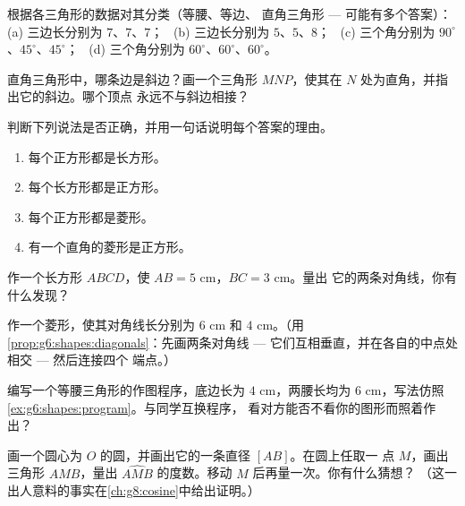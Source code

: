 \begin{exercise}[$\star$]\label{exo:g6:shapes:4}
根据各三角形的数据对其分类（等腰、等边、
直角三角形 --- 可能有多个答案）：
(a) 三边长分别为 $7$、$7$、$7$； \
(b) 三边长分别为 $5$、$5$、$8$； \
(c) 三个角分别为 $90^\circ$、$45^\circ$、$45^\circ$； \
(d) 三个角分别为 $60^\circ$、$60^\circ$、$60^\circ$。
\end{exercise}

\begin{exercise}[$\star$]\label{exo:g6:shapes:5}
直角三角形中，哪条边是斜边？画一个三角形
$MNP$，使其在 $N$ 处为直角，并指出它的斜边。哪个顶点
永远不与斜边相接？
\end{exercise}

\begin{exercise}[$\star$]\label{exo:g6:shapes:6}
判断下列说法是否正确，并用一句话说明每个答案的理由。
\begin{enumerate}
  \item 每个正方形都是长方形。
  \item 每个长方形都是正方形。
  \item 每个正方形都是菱形。
  \item 有一个直角的菱形是正方形。
\end{enumerate}
\end{exercise}

\begin{exercise}[$\star$]\label{exo:g6:shapes:7}
作一个长方形 $ABCD$，使 $AB = 5$ cm，$BC = 3$ cm。量出
它的两条对角线，你有什么发现？
\end{exercise}

\begin{exercise}[$\star$]\label{exo:g6:shapes:8}
作一个菱形，使其对角线长分别为 $6$ cm 和 $4$ cm。（用
\cref{prop:g6:shapes:diagonals}：先画两条对角线 ---
它们互相垂直，并在各自的中点处相交 --- 然后连接四个
端点。）
\end{exercise}

\begin{exercise}[$\star\star$]\label{exo:g6:shapes:9}
编写一个等腰三角形的作图程序，底边长为
$4$ cm，两腰长均为 $6$ cm，写法仿照
\cref{ex:g6:shapes:program}。与同学互换程序，
看对方能否不看你的图形而照着作出？
\end{exercise}

\begin{exercise}[$\star\star$]\label{exo:g6:shapes:10}
画一个圆心为 $O$ 的圆，并画出它的一条直径 $[AB]$。在圆上任取一
点 $M$，画出三角形 $AMB$，量出
$\widehat{AMB}$ 的度数。移动 $M$ 后再量一次。你有什么猜想？
（这一出人意料的事实在\cref{ch:g8:cosine}中给出证明。）
\end{exercise}

